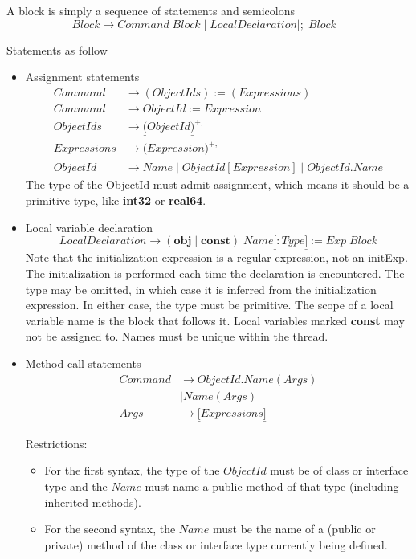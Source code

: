 \documentclass{article}%
\begin{document}
A block is simply a sequence of statements and semicolons%
\[
Block\rightarrow Command\;Block\mid LocalDeclaration\mid;\;Block\mid
\]


Statements as follow

\begin{itemize}
\item Assignment statements%
\begin{align*}
Command  &  \rightarrow(ObjectIds):=(Expressions)\\
Command  &  \rightarrow ObjectId:=Expression\\
ObjectIds  &  \rightarrow\underline{(}ObjectId\underline{)}^{+,}\\
Expressions  &  \rightarrow\underline{(}Expression\underline{)}^{+,}\\
ObjectId  &  \rightarrow Name\mid ObjectId[Expression]\mid ObjectId.Name
\end{align*}
The type of the ObjectId must admit assignment, which means it should be a
primitive type, like \textbf{int32} or \textbf{real64}.

\item Local variable declaration%
\[
LocalDeclaration\rightarrow(\mathbf{obj}\mid\mathbf{const})\;Name\underline{[}%
:Type\underline{]}:=Exp\;Block
\]
Note that the initialization expression is a regular expression, not an
initExp. The initialization is performed each time the declaration is
encountered. The type may be omitted, in which case it is inferred from the
initialization expression. In either case, the type must be primitive. The
scope of a local variable name is the block that follows it. Local variables
marked \textbf{const} may not be assigned to. Names must be unique within the thread.

\item Method call statements%
\begin{align*}
Command  &  \rightarrow ObjectId.Name(Args)\\
&  \mid Name(Args)\\
Args  &  \rightarrow\underline{[}Expressions\underline{]}%
\end{align*}


Restrictions:

\begin{itemize}
\item For the first syntax, the type of the $ObjectId$ must be of class or
interface type and the $Name$ must name a public method of that type
(including inherited methods).

\item For the second syntax, the $Name$ must be the name of a (public or
private) method of the class or interface type currently being defined.


\end{itemize}
\end{itemize}
\end{document}
